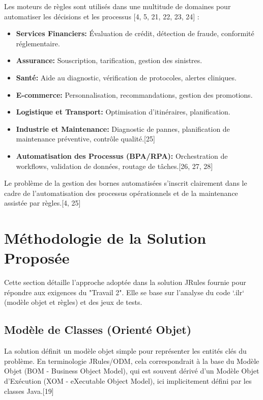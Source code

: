 \documentclass[11pt,a4paper]{article}
\begin{document}
Les moteurs de règles sont utilisés dans une multitude de domaines pour automatiser les décisions et les processus [4, 5, 21, 22, 23, 24] :
\begin{itemize}
    \item \textbf{Services Financiers:} Évaluation de crédit, détection de fraude, conformité réglementaire.
    \item \textbf{Assurance:} Souscription, tarification, gestion des sinistres.
    \item \textbf{Santé:} Aide au diagnostic, vérification de protocoles, alertes cliniques.
    \item \textbf{E-commerce:} Personnalisation, recommandations, gestion des promotions.
    \item \textbf{Logistique et Transport:} Optimisation d'itinéraires, planification.
    \item \textbf{Industrie et Maintenance:} Diagnostic de pannes, planification de maintenance préventive, contrôle qualité.[25]
    \item \textbf{Automatisation des Processus (BPA/RPA):} Orchestration de workflows, validation de données, routage de tâches.[26, 27, 28]
\end{itemize}
Le problème de la gestion des bornes automatisées s'inscrit clairement dans le cadre de l'automatisation des processus opérationnels et de la maintenance assistée par règles.[4, 25]

\section{Méthodologie de la Solution Proposée}
\label{sec:methodologie}

Cette section détaille l'approche adoptée dans la solution JRules fournie pour répondre aux exigences du "Travail 2". Elle se base sur l'analyse du code `.ilr` (modèle objet et règles) et des jeux de tests.

\subsection{Modèle de Classes (Orienté Objet)}

La solution définit un modèle objet simple pour représenter les entités clés du problème. En terminologie JRules/ODM, cela correspondrait à la base du Modèle Objet (BOM - Business Object Model), qui est souvent dérivé d'un Modèle Objet d'Exécution (XOM - eXecutable Object Model), ici implicitement défini par les classes Java.[19]
\end{document}
